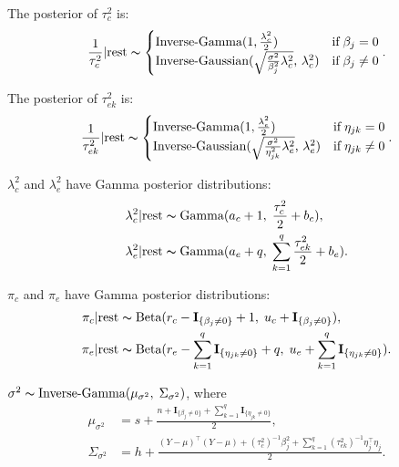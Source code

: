\documentclass[12pt]{article}
\begin{document}
The posterior of $\tau_{c}^{2}$ is:
	\begin{equation*}
	\frac{1}{\tau_{c}^{2}}|\text{rest} \thicksim \begin{cases}
	\scalebox{1}{Inverse-Gamma($1$,\,$\frac{\lambda_{c}^{2}}{2}$)}& { \text{if} \; \beta_{j} = 0}\\
	\scalebox{1}{Inverse-Gaussian($\sqrt{\frac{\sigma^{2}}{\beta_{j}^{2}}\lambda_{c}^{2}}$, $\lambda_{c}^{2}$)}& { \text{if} \; \beta_{j} \neq 0}
	\end{cases}.
	\end{equation*}

The posterior of $\tau_{ek}^{2}$ is:
	\begin{equation*}
	\frac{1}{\tau_{ek}^{2}}|\text{rest} \thicksim \begin{cases}
	\scalebox{1}{Inverse-Gamma($1$,\,$\frac{\lambda_{e}^{2}}{2}$)}& { \text{if} \; \eta_{jk} = 0} \\
	\scalebox{1}{Inverse-Gaussian($\sqrt{\frac{\sigma^{2}}{\eta_{jk}^{2}}\lambda_{e}^{2}}$, $\lambda_{e}^{2}$)}& { \text{if} \; \eta_{jk} \neq 0}
	\end{cases}.
	\end{equation*}

$\lambda_{c}^{2}$ and $\lambda_{e}^{2}$ have Gamma posterior distributions:
\begin{equation*}
\begin{aligned}
\lambda_{c}^{2}|\text{rest} & \thicksim \text{Gamma} (a_c+1,\; \frac{\tau_{c}^{2}}{2}+b_c),\\
\lambda_{e}^{2}|\text{rest} & \thicksim \text{Gamma} (a_e+q,\; \sum_{k=1}^{q}\frac{\tau_{ek}^{2}}{2}+b_e).\\
\end{aligned}
\end{equation*}

$\pi_{c}$ and $\pi_{e}$ have Gamma posterior distributions:
\begin{equation*}
\begin{aligned}
\pi_{c}|\text{rest}& \thicksim \text{Beta}(r_{c}-\textbf{I}_{\{\beta_{j} \neq 0\}}+1, \; u_{c}+ \textbf{I}_{\{\beta_{j} \neq 0\}}),\\
\pi_{e}|\text{rest} &\thicksim \text{Beta}(r_{e}-\sum_{k=1}^{q}\textbf{I}_{\{\eta_{jk} \neq 0\}}+q, \; u_{e}+\sum_{k=1}^{q}\textbf{I}_{\{\eta_{jk} \neq 0\}}).
\end{aligned}
\end{equation*}

$\sigma^2 \thicksim \text{Inverse-Gamma}(\mu_{\sigma^2}, \; \Sigma_{\sigma^2})$, where
\begin{equation*}
\begin{aligned}
\mu_{\sigma^2} &= s+\frac{n+\textbf{I}_{\{\beta_{j} \neq 0\}}+\sum_{k=1}^{q}\textbf{I}_{\{\eta_{jk} \neq 0\}}}{2},\\
\Sigma_{\sigma^2} &= h+\frac{(Y-\mu)^\top (Y-\mu)+(\tau_{c}^{2})^{-1}\beta_{j}^{2} + \sum_{k=1}^{q}(\tau_{ek}^{2})^{-1} \eta_{j}^\top \eta_{j}}{2}.
\end{aligned}
\end{equation*}
\end{document}
